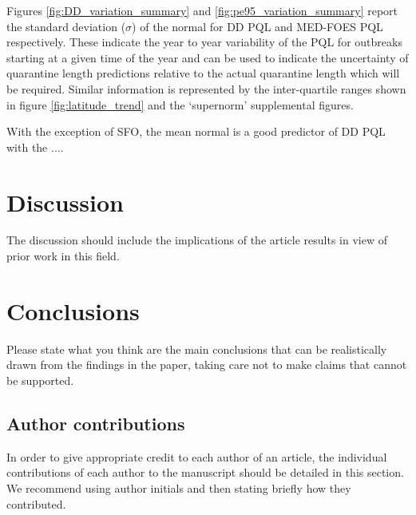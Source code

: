 \documentclass[10pt,a4paper,twocolumn]{article}
\begin{document}
Figures \ref{fig:DD_variation_summary} and \ref{fig:pe95_variation_summary}
report the standard deviation ($\sigma$) of the normal for DD PQL and MED-FOES PQL respectively.
These indicate the year to year variability of the PQL for outbreaks starting at a
given time of the year and can be used to indicate the uncertainty of quarantine length predictions 
relative to the actual quarantine length which will be required.
Similar information is represented by the inter-quartile ranges shown in figure \ref{fig:latitude_trend} and 
the `supernorm' supplemental figures.

With the exception of SFO, the mean normal is a good predictor of DD PQL with the  ....





\section*{Discussion}
The discussion should include the implications of the article results in view of prior work in this field.

\section*{Conclusions}
Please state what you think are the main conclusions that can be realistically drawn from the findings in the paper, taking care not to make claims that cannot be supported.



\subsection*{Author contributions}
In order to give appropriate credit to each author of an article, the individual
contributions of each author to the manuscript should be detailed in this section. We
recommend using author initials and then stating briefly how they contributed.
\end{document}
